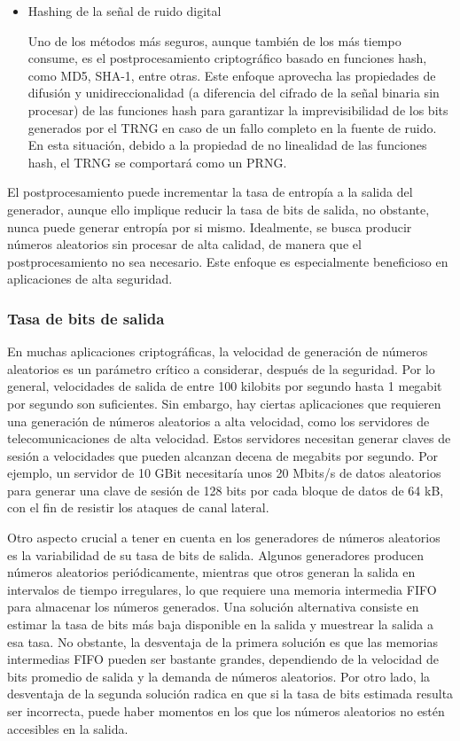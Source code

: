 \begin{itemize}
                
                \item Hashing de la señal de ruido digital

                    Uno de los métodos más seguros, aunque también de los más tiempo consume, es el postprocesamiento criptográfico basado en funciones hash, como MD5, SHA-1, entre otras. Este enfoque aprovecha las propiedades de difusión y unidireccionalidad (a diferencia del cifrado de la señal binaria sin procesar) de las funciones hash para garantizar la imprevisibilidad de los bits generados por el TRNG en caso de un fallo completo en la fuente de ruido. En esta situación, debido a la propiedad de no linealidad de las funciones hash, el TRNG se comportará como un PRNG.
                
            \end{itemize}
	
            El postprocesamiento puede incrementar la tasa de entropía a la salida del generador, aunque ello implique reducir la tasa de bits de salida, no obstante, nunca puede generar entropía por si mismo. Idealmente, se busca producir números aleatorios sin procesar de alta calidad, de manera que el postprocesamiento no sea necesario. Este enfoque es especialmente beneficioso en aplicaciones de alta seguridad.

            \subsubsection{Tasa de bits de salida}

            En muchas aplicaciones criptográficas, la velocidad de generación de números aleatorios es un parámetro crítico a considerar, después de la seguridad. Por lo general, velocidades de salida de entre 100 kilobits por segundo hasta 1 megabit por segundo son suficientes. Sin embargo, hay ciertas aplicaciones que requieren una generación de números aleatorios a alta velocidad, como los servidores de telecomunicaciones de alta velocidad. Estos servidores necesitan generar claves de sesión a velocidades que pueden alcanzan decena de megabits por segundo. Por ejemplo, un servidor de 10 GBit necesitaría unos 20 Mbits/s de datos aleatorios para generar una clave de sesión de 128 bits por cada bloque de datos de 64 kB, con el fin de resistir los ataques de canal lateral.

            Otro aspecto crucial a tener en cuenta en los generadores de números aleatorios es la variabilidad de su tasa de bits de salida. Algunos generadores producen números aleatorios periódicamente, mientras que otros generan la salida en intervalos de tiempo irregulares, lo que requiere una memoria intermedia FIFO para almacenar los números generados. Una solución alternativa consiste en estimar la tasa de bits más baja disponible en la salida y muestrear la salida a esa tasa. No obstante, la desventaja de la primera solución es que las memorias intermedias FIFO pueden ser bastante grandes, dependiendo de la velocidad de bits promedio de salida y la demanda de números aleatorios. Por otro lado, la desventaja de la segunda solución radica en que si la tasa de bits estimada resulta ser incorrecta, puede haber momentos en los que los números aleatorios no estén accesibles en la salida.
	
